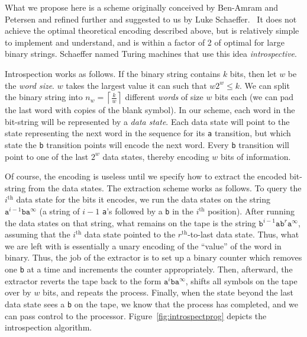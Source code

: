 \documentclass[11pt]{article}
\begin{document}
What we propose here is a scheme originally conceived by Ben-Amram and Petersen and refined further and suggested to us by Luke Schaeffer.~\cite{benamram} It does not achieve the optimal theoretical encoding described above, but is relatively simple to implement and understand, and is within a factor of 2 of optimal for large binary strings. Schaeffer named Turing machines that use this idea \emph{introspective}.  

Introspection works as follows. If the binary string contains $k$ bits, then let $w$ be the \emph{word size}. $w$ takes the largest value it can such that $w2^w \le k$. We can split the binary string into $n_w = \left \lceil{\frac{k}{w}}\right \rceil$ different \emph{words} of size $w$ bits each (we can pad the last word with copies of the blank symbol). In our scheme, each word in the bit-string will be represented by a \emph{data state}. Each data state will point to the state representing the next word in the sequence for its \texttt{a} transition, but which state the \texttt{b} transition points will encode the next word. Every \texttt{b} transition will point to one of the last $2^w$ data states, thereby encoding $w$ bits of information. 

Of course, the encoding is useless until we specify how to extract the encoded bit-string from the data states. The extraction scheme works as follows. To query the $i^\textrm{th}$ data state for the bits it encodes, we run the data states on the string $\texttt{a}^{i-1}\texttt{b}\texttt{a}^{\infty}$ (a string of $i-1$ \texttt{a}'s followed by a \texttt{b} in the $i^\textrm{th}$ position). After running the data states on that string, what remains on the tape is the string $\texttt{b}^{i-1}\texttt{a}\texttt{b}^r\texttt{a}^{\infty}$, assuming that the $i^\textrm{th}$ data state pointed to the $r^\textrm{th}$-to-last data state. Thus, what we are left with is essentially a unary encoding of the ``value'' of the word in binary. Thus, the job of the extractor is to set up a binary counter which removes one \texttt{b} at a time and increments the counter appropriately. Then, afterward, the extractor reverts the tape back to the form $\texttt{a}^i\texttt{b}\texttt{a}^{\infty}$, shifts all symbols on the tape over by $w$ bits, and repeats the process. Finally, when the state beyond the last data state sees a \texttt{b} on the tape, we know that the process has completed, and we can pass control to the processor. Figure~\ref{fig:introspectprog} depicts the introspection algorithm.
\end{document}
